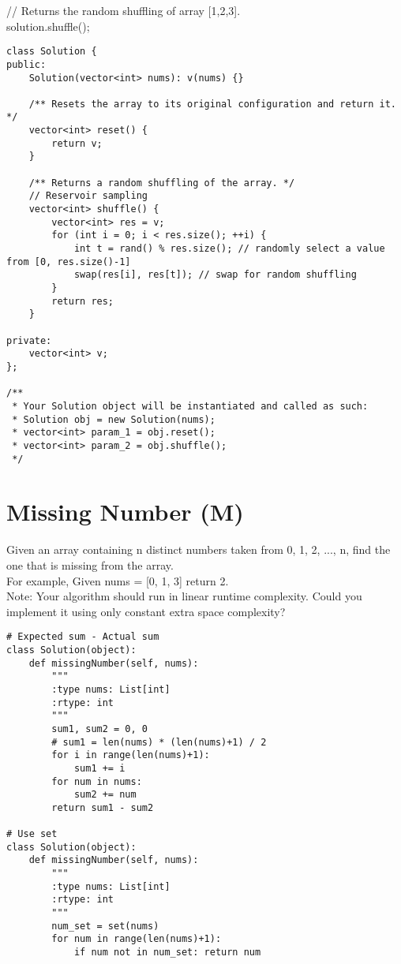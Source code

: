 // Returns the random shuffling of array [1,2,3].\\
solution.shuffle();\\

\begin{lstlisting}
class Solution {
public:
    Solution(vector<int> nums): v(nums) {}
    
    /** Resets the array to its original configuration and return it. */
    vector<int> reset() {
        return v;
    }
    
    /** Returns a random shuffling of the array. */
    // Reservoir sampling
    vector<int> shuffle() {
        vector<int> res = v;
        for (int i = 0; i < res.size(); ++i) {
            int t = rand() % res.size(); // randomly select a value from [0, res.size()-1]
            swap(res[i], res[t]); // swap for random shuffling
        }
        return res;
    }
    
private:
    vector<int> v;
};

/**
 * Your Solution object will be instantiated and called as such:
 * Solution obj = new Solution(nums);
 * vector<int> param_1 = obj.reset();
 * vector<int> param_2 = obj.shuffle();
 */
\end{lstlisting}


\section{Missing Number (M)}
Given an array containing n distinct numbers taken from 0, 1, 2, ..., n, find the one that is missing from the array.\\

For example, 
Given nums = [0, 1, 3] return 2.\\

Note:
Your algorithm should run in linear runtime complexity. Could you implement it using only constant extra space complexity? \\

\begin{lstlisting}
# Expected sum - Actual sum
class Solution(object):
    def missingNumber(self, nums):
        """
        :type nums: List[int]
        :rtype: int
        """
        sum1, sum2 = 0, 0
        # sum1 = len(nums) * (len(nums)+1) / 2
        for i in range(len(nums)+1):
            sum1 += i
        for num in nums:
            sum2 += num
        return sum1 - sum2

# Use set
class Solution(object):
    def missingNumber(self, nums):
        """
        :type nums: List[int]
        :rtype: int
        """
        num_set = set(nums)
        for num in range(len(nums)+1):
            if num not in num_set: return num
\end{lstlisting}        

